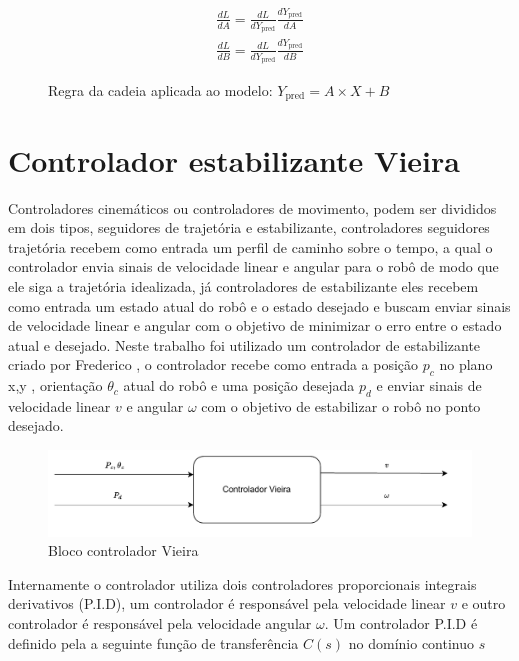 \begin{figure}[H]
    \begin{align*}
        \frac{dL}{dA } = \frac{dL}{dY_{\text{pred}} } \frac{dY_{\text{pred}}}{dA}  \\
        \frac{dL}{dB } = \frac{dL}{dY_{\text{pred}} } \frac{dY_{\text{pred}}}{dB} 
    \end{align*}
    \caption{Regra da cadeia aplicada ao modelo: $Y_{\text{pred}}= A \times X + B$ }
\end{figure}



\section{Controlador estabilizante Vieira}
Controladores cinemáticos ou controladores de movimento, podem ser 
divididos em dois tipos, seguidores de trajetória e estabilizante,
controladores seguidores trajetória recebem como entrada um perfil
de caminho sobre o tempo, a qual o controlador envia sinais de
velocidade linear e angular para o robô de modo que ele siga a
trajetória idealizada, já controladores de estabilizante
eles recebem como entrada um estado atual do robô e o estado desejado
e buscam enviar sinais de velocidade linear e angular com o objetivo
de minimizar o erro entre o estado atual e desejado. Neste trabalho
foi utilizado um controlador de estabilizante criado por Frederico
\cite{vieira2006controle}, o controlador recebe como entrada a posição
$p_c$  no plano x,y , orientação $\theta_c$ atual do robô e uma posição desejada $p_d$
e enviar sinais de velocidade linear $v$ e angular $\omega$ com o
objetivo de estabilizar o robô no ponto desejado.

\begin{figure}[H]
    \centering
    \includegraphics[scale=0.8]{figuras/controlador_viera.pdf}
    \caption{Bloco controlador Vieira}
\end{figure}

Internamente o controlador utiliza  dois controladores proporcionais
integrais derivativos (P.I.D), um controlador é responsável pela velocidade linear $v$
e outro controlador é responsável pela velocidade angular $\omega$. 
Um controlador P.I.D é definido pela a seguinte função de
transferência $C(s)$ no domínio continuo $s$

